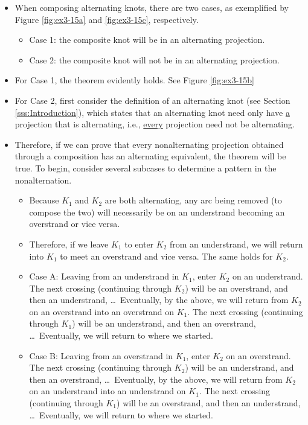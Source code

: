\documentclass[titlepage]{article}
\numberwithin{figure}{section}
\numberwithin{table}{section}
\numberwithin{equation}{section}
\begin{document}
\begin{itemize}
\begin{figure}[h!]
        \label{fig:ex3-15}
    \end{figure}
    \begin{itemize}
        \item When composing alternating knots, there are two cases, as exemplified by Figure \ref{fig:ex3-15a} and \ref{fig:ex3-15c}, respectively.
        \begin{itemize}
            \item Case 1: the composite knot will be in an alternating projection.
            \item Case 2: the composite knot will not be in an alternating projection.
        \end{itemize}
        \item For Case 1, the theorem evidently holds. See Figure \ref{fig:ex3-15b}
        \item For Case 2, first consider the definition of an alternating knot (see Section \ref{sss:Introduction}), which states that an alternating knot need only have \underline{a} projection that is alternating, i.e., \underline{every} projection need not be alternating.
        \item Therefore, if we can prove that every nonalternating projection obtained through a composition has an alternating equivalent, the theorem will be true. To begin, consider several subcases to determine a pattern in the nonalternation.
        \begin{itemize}
            \item Because $K_1$ and $K_2$ are both alternating, any arc being removed (to compose the two) will necessarily be on an understrand becoming an overstrand or vice versa.
            \item Therefore, if we leave $K_1$ to enter $K_2$ from an understrand, we will return into $K_1$ to meet an overstrand and vice versa. The same holds for $K_2$.
            \item Case A: Leaving from an understrand in $K_1$, enter $K_2$ on an understrand. The next crossing (continuing through $K_2$) will be an overstrand, and then an understrand, \dots\ Eventually, by the above, we will return from $K_2$ on an overstrand into an overstrand on $K_1$. The next crossing (continuing through $K_1$) will be an understrand, and then an overstrand, \dots\ Eventually, we will return to where we started.
            \item Case B: Leaving from an overstrand in $K_1$, enter $K_2$ on an overstrand. The next crossing (continuing through $K_2$) will be an understrand, and then an overstrand, \dots\ Eventually, by the above, we will return from $K_2$ on an understrand into an understrand on $K_1$. The next crossing (continuing through $K_1$) will be an overstrand, and then an understrand, \dots\ Eventually, we will return to where we started.

\end{itemize}
\end{itemize}
\end{itemize}
\end{document}
